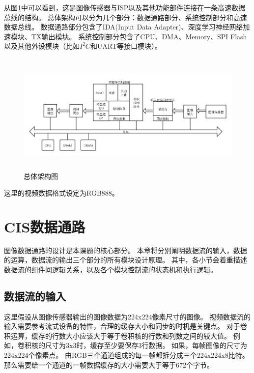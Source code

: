 从图\ref{fig:top_arch}中可以看到，这是图像传感器与ISP以及其他功能部件连接在一条高速数据总线的结构。
总体架构可以分为几个部分：数据通路部分、系统控制部分和高速数据总线。
数据通路部分包含了IDA(Input Data Adapter)、深度学习神经网络加速模块、TX输出模块。
系统控制部分包含了CPU、DMA、Memory、SPI Flash以及其他外设模块（比如$I^2C$和UART等接口模块）。
\begin{figure}[htbp]
    \centering
    \includegraphics[width=15cm,height=6cm]{figures/top_arch.png}
    \caption{总体架构图}
    \label{fig:top_arch}
\end{figure}
这里的视频数据格式设定为RGB888。

\section{CIS数据通路}
图像数据通路的设计是本课题的核心部分。
本章将分别阐明数据流的输入，数据的运算，数据流的输出三个部分的所有模块设计原理。
其中，各小节会着重描述数据流的组件间逻辑关系，以及各个模块控制流的状态机和执行逻辑。



\subsection{数据流的输入}

这里假设从图像传感器输出的图像数据为224x224像素尺寸的图像。
视频数据流的输入需要参考流式设备的特性，合理的缓存大小和同步的时机是关键点。
对于卷积运算，缓存的行数大小应该大于等于卷积核的行数和列数之间的较大值。
例如，卷积核的尺寸为3x3时，缓存至少要保存3行数据。
如果，每帧图像的尺寸为224x224个像素点。
由RGB三个通道组成的每一帧都拆分成三个224x224x8比特。
那么需要给一个通道的一帧数据缓存的大小需要大于等于672个字节。

